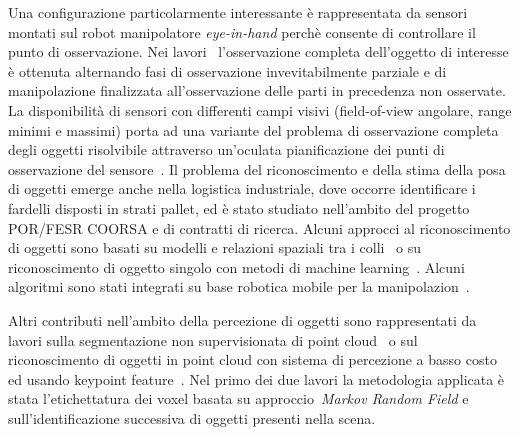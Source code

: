 \documentclass[11pt]{article}
\begin{document}
Una configurazione particolarmente interessante \`e rappresentata da sensori montati sul robot manipolatore 
\emph{eye-in-hand} perch\`e consente di controllare il punto di osservazione. 
Nei lavori~\cite{aleotti2014jirs,aleotti2012icra} l'osservazione completa dell'oggetto di interesse
\`e ottenuta alternando fasi di osservazione invevitabilmente parziale e di manipolazione finalizzata 
all'osservazione delle parti in precedenza non osservate.
La disponibilit\`a di sensori con differenti campi visivi (field-of-view angolare, range minimi e massimi) porta ad una variante del problema di osservazione completa degli oggetti risolvibile attraverso un'oculata pianificazione dei punti di osservazione del sensore~\cite{aleotti2014iros}. 
Il problema del riconoscimento e della stima della posa di oggetti emerge anche nella logistica industriale, dove occorre identificare i fardelli disposti in strati pallet, 
ed \`e stato studiato nell'ambito del progetto POR/FESR COORSA e di contratti di ricerca.
Alcuni approcci al riconoscimento di oggetti sono basati su modelli e relazioni spaziali tra i colli~\cite{monica2020irc, fontana2021iccp} o su riconoscimento di oggetto singolo con metodi di machine learning~\cite{fontana2021ecmr}. 
Alcuni algoritmi sono stati integrati su base robotica mobile per la manipolazion~\cite{chiaravalli2020etfa, aleotti2021ap}. 

Altri contributi nell'ambito della percezione di oggetti sono rappresentati da lavori sulla segmentazione non supervisionata di point cloud~\cite{lodirizzini2014ias} o sul riconoscimento di oggetti in point cloud con sistema di percezione a basso costo ed usando keypoint feature~\cite{oleari2013iccp}. 
Nel primo dei due lavori la metodologia applicata \`e stata l'etichettatura dei voxel basata su approccio~\emph{Markov Random Field} e sull'identificazione successiva di oggetti presenti nella scena. 

 
\end{document}
